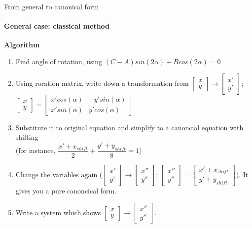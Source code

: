 \documentclass[aspectratio=169]{beamer}
\begin{document}
\begin{frame}[t]{From general to canonical form}
\framesubtitle{General case: classical method}
\scriptsize
\vspace{-0.2cm}
        \textbf{Algorithm}
        \begin{enumerate}
            \item Find angle of rotation, using $(C-A)sin(2\alpha) + Bcos(2\alpha)=0$
            \item Using roration matrix, write down a transformation from $\begin{bmatrix}x\\y\end{bmatrix} \rightarrow \begin{bmatrix}x'\\y'\end{bmatrix}$; $\begin{bmatrix}x\\y\end{bmatrix} = \begin{bmatrix}
            x'cos(\alpha) & -y'sin(\alpha)\\ 
            x'sin(\alpha) & y'cos(\alpha) 
            \end{bmatrix}$
            \item Substitute it to original equation and simplify to a canoncial equation with shifting \\ (for instance, $\dfrac{x'+x_{shift}}{2}+\dfrac{y'+y_{shift}}{8}=1$)
            \item Change the variables again ($\begin{bmatrix}x'\\y'\end{bmatrix} \rightarrow \begin{bmatrix}x''\\y''\end{bmatrix}$; $\begin{bmatrix}x''\\y''\end{bmatrix} = \begin{bmatrix}x' + x_{shift}\\y'+y_{shift}\end{bmatrix}$). It gives you a pure canoncical form.
            \item Write a system which shows $\begin{bmatrix}x\\y\end{bmatrix} \rightarrow \begin{bmatrix}x''\\y''\end{bmatrix}$.
        \end{enumerate}
\end{frame}
\end{document}
